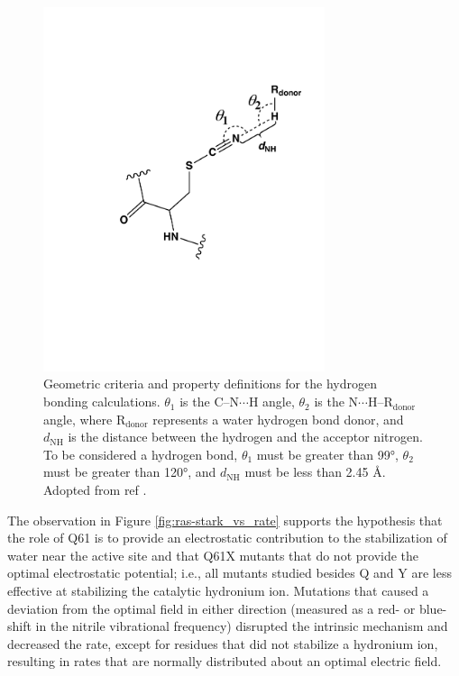 \begin{figure}
    \center
    \includegraphics[width=3.25in]{figures-ras/Figure_S4.pdf}
    \caption{Geometric criteria and property definitions for the hydrogen bonding calculations. $\theta_1$ is the C--N$\cdots$H angle, $\theta_2$ is the N$\cdots$H--R$_{\text{donor}}$ angle, where R$_{\text{donor}}$ represents a water hydrogen bond donor, and $d_{\text{NH}}$ is the distance between the hydrogen and the acceptor nitrogen. To be considered a hydrogen bond, $\theta_1$ must be greater than \ang{99}, $\theta_2$ must be greater than \ang{120}, and $d_{\text{NH}}$ must be less than 2.45 \si{\angstrom}. Adopted from ref .} 
    \label{fig:ras-hbond}
\end{figure}

The observation in Figure \ref{fig:ras-stark_vs_rate} supports the hypothesis that the role of Q61 is to provide an electrostatic contribution to the stabilization of water near the active site and that Q61X mutants that do not provide the optimal electrostatic potential; i.e., all mutants studied besides Q and Y are less effective at stabilizing the catalytic hydronium ion. 
Mutations that caused a deviation from the optimal field in either direction (measured as a red- or blue-shift in the nitrile vibrational frequency) disrupted the intrinsic mechanism and decreased the rate, except for residues that did not stabilize a hydronium ion, resulting in rates that are normally distributed about an optimal electric field.

